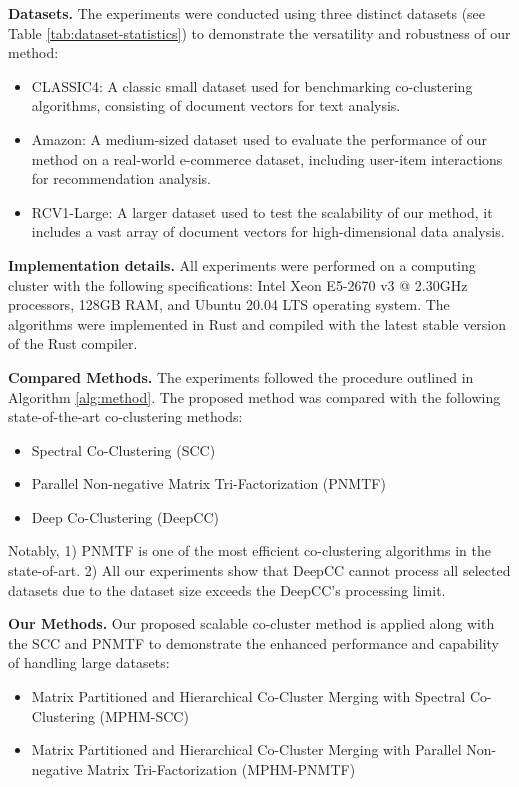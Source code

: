 \documentclass[journal]{IEEEtran}
\renewcommand{\cite}[1]{~\autocite{#1}}
\begin{document}
\textbf{Datasets.}
The experiments were conducted using three distinct datasets (see Table \ref{tab:dataset-statistics}) to demonstrate the versatility and robustness of our method:

\begin{itemize}
  \item CLASSIC4: A classic small dataset used for benchmarking co-clustering algorithms, consisting of document vectors for text analysis.
  \item Amazon: A medium-sized dataset used to evaluate the performance of our method on a real-world e-commerce dataset, including user-item interactions for recommendation analysis.
  \item RCV1-Large: A larger dataset used to test the scalability of our method, it includes a vast array of document vectors for high-dimensional data analysis.
\end{itemize}

\textbf{Implementation details.}
All experiments were performed on a computing cluster with the following specifications: Intel Xeon E5-2670 v3 @ 2.30GHz processors, 128GB RAM, and Ubuntu 20.04 LTS operating system. The algorithms were implemented in Rust and compiled with the latest stable version of the Rust compiler.

\textbf{Compared Methods.}
The experiments followed the procedure outlined in Algorithm \ref{alg:method}. The proposed method was compared with the following state-of-the-art co-clustering methods:

\begin{itemize}
  \item Spectral Co-Clustering (SCC) \cite{dhillon2001CoclusteringDocumentsWords}
  \item Parallel Non-negative Matrix Tri-Factorization (PNMTF)\cite{chen2023ParallelNonNegativeMatrix}
  \item Deep Co-Clustering (DeepCC)\cite{dongkuanxu2019DeepCoClustering}
\end{itemize}

Notably, 1) PNMTF is one of the most efficient co-clustering algorithms in the state-of-art. 2) All our experiments show that DeepCC cannot process all selected datasets due to the dataset size exceeds the DeepCC's processing limit.

\textbf{Our Methods.} Our proposed scalable co-cluster method is applied along with the SCC and PNMTF to demonstrate the enhanced performance and capability of handling large datasets:
\begin{itemize}
  \item Matrix Partitioned and Hierarchical Co-Cluster Merging with Spectral Co-Clustering (MPHM-SCC)
  \item Matrix Partitioned and Hierarchical Co-Cluster Merging with Parallel Non-negative Matrix Tri-Factorization (MPHM-PNMTF)
\end{itemize}
\end{document}
